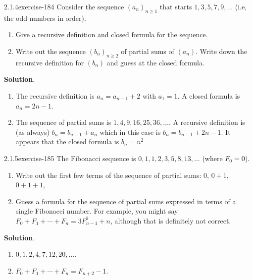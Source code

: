\documentclass[twoside,11pt,]{book}
\numberwithin{equation}{chapter}
\begin{document}
\begin{divisionsolution}{2.1.4}{}{exercise-184}%
\hypertarget{p-3015}{}%
Consider the sequence \((a_n)_{n \ge 1}\) that starts \(1, 3, 5, 7, 9, \ldots\) (i.e, the odd numbers in order).\leavevmode%
\begin{enumerate}[label=(\alph*)]
\item\hypertarget{li-1770}{}\hypertarget{p-3016}{}%
Give a recursive definition and closed formula for the sequence.%
\item\hypertarget{li-1771}{}\hypertarget{p-3017}{}%
Write out the sequence \((b_n)_{n \ge 2}\) of partial sums of \((a_n)\).  Write down the recursive definition for \((b_n)\) and guess at the closed formula.%
\end{enumerate}
%
\par\smallskip%
\noindent\textbf{Solution}.\quad%
\hypertarget{p-3018}{}%
\leavevmode%
\begin{enumerate}[label=(\alph*)]
\item\hypertarget{li-1772}{}\hypertarget{p-3019}{}%
The recursive definition is \(a_n = a_{n-1} + 2\) with \(a_1 = 1\).  A closed formula is \(a_n = 2n-1\).%
\item\hypertarget{li-1773}{}\hypertarget{p-3020}{}%
The sequence of partial sums is \(1, 4, 9, 16, 25, 36, \ldots\).  A recursive definition is (as always) \(b_n = b_{n-1} + a_n\) which in this case is \(b_n = b_{n-1} + 2n-1\).  It appears that the closed formula is \(b_n = n^2\)%
\end{enumerate}
%
\end{divisionsolution}%
\begin{divisionsolution}{2.1.5}{}{exercise-185}%
\label{notation-32}
\hypertarget{p-3021}{}%
The Fibonacci sequence is \(0, 1, 1, 2, 3, 5, 8, 13, \ldots\) (where \(F_0 = 0\)). \leavevmode%
\begin{enumerate}[label=(\alph*)]
\item\hypertarget{li-1774}{}\hypertarget{p-3022}{}%
Write out the first few terms of the sequence of partial sums: \(0\), \(0+1\), \(0+1+1\),\textellipsis{}%
\item\hypertarget{li-1775}{}\hypertarget{p-3023}{}%
Guess a formula for the sequence of partial sums expressed in terms of a single Fibonacci number.  For example, you might say \(F_0 + F_1 + \cdots + F_n = 3F_{n-1}^2 + n\), although that is definitely not correct.%
\end{enumerate}
%
\par\smallskip%
\noindent\textbf{Solution}.\quad%
\hypertarget{p-3024}{}%
\leavevmode%
\begin{enumerate}[label=(\alph*)]
\item\hypertarget{li-1776}{}\(0, 1, 2, 4, 7, 12, 20, \ldots\).%
\item\hypertarget{li-1777}{}\(F_0 + F_1 + \cdots + F_n = F_{n+2} - 1\).%
\end{enumerate}
%
\end{divisionsolution}%
\end{document}
